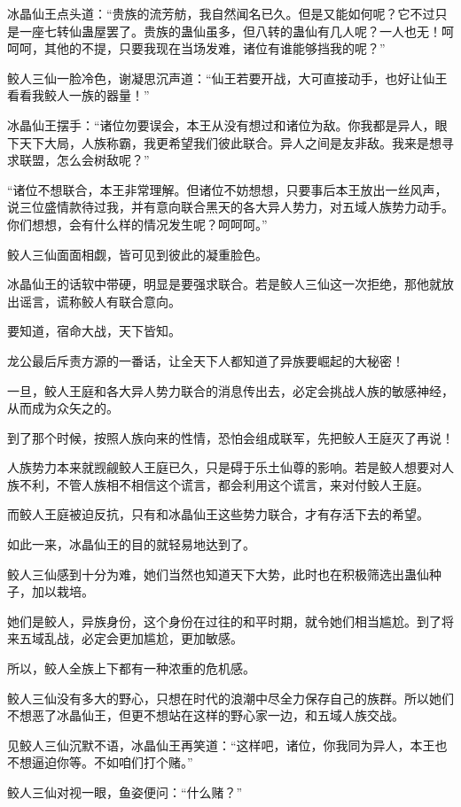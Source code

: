\begin{this_body}
冰晶仙王点头道：“贵族的流芳舫，我自然闻名已久。但是又能如何呢？它不过只是一座七转仙蛊屋罢了。贵族的蛊仙虽多，但八转的蛊仙有几人呢？一人也无！呵呵呵，其他的不提，只要我现在当场发难，诸位有谁能够挡我的呢？”

鲛人三仙一脸冷色，谢凝思沉声道：“仙王若要开战，大可直接动手，也好让仙王看看我鲛人一族的器量！”

冰晶仙王摆手：“诸位勿要误会，本王从没有想过和诸位为敌。你我都是异人，眼下天下大局，人族称霸，我更希望我们彼此联合。异人之间是友非敌。我来是想寻求联盟，怎么会树敌呢？”

“诸位不想联合，本王非常理解。但诸位不妨想想，只要事后本王放出一丝风声，说三位盛情款待过我，并有意向联合黑天的各大异人势力，对五域人族势力动手。你们想想，会有什么样的情况发生呢？呵呵呵。”

鲛人三仙面面相觑，皆可见到彼此的凝重脸色。

冰晶仙王的话软中带硬，明显是要强求联合。若是鲛人三仙这一次拒绝，那他就放出谣言，谎称鲛人有联合意向。

要知道，宿命大战，天下皆知。

龙公最后斥责方源的一番话，让全天下人都知道了异族要崛起的大秘密！

一旦，鲛人王庭和各大异人势力联合的消息传出去，必定会挑战人族的敏感神经，从而成为众矢之的。

到了那个时候，按照人族向来的性情，恐怕会组成联军，先把鲛人王庭灭了再说！

人族势力本来就觊觎鲛人王庭已久，只是碍于乐土仙尊的影响。若是鲛人想要对人族不利，不管人族相不相信这个谎言，都会利用这个谎言，来对付鲛人王庭。

而鲛人王庭被迫反抗，只有和冰晶仙王这些势力联合，才有存活下去的希望。

如此一来，冰晶仙王的目的就轻易地达到了。

鲛人三仙感到十分为难，她们当然也知道天下大势，此时也在积极筛选出蛊仙种子，加以栽培。

她们是鲛人，异族身份，这个身份在过往的和平时期，就令她们相当尴尬。到了将来五域乱战，必定会更加尴尬，更加敏感。

所以，鲛人全族上下都有一种浓重的危机感。

鲛人三仙没有多大的野心，只想在时代的浪潮中尽全力保存自己的族群。所以她们不想恶了冰晶仙王，但更不想站在这样的野心家一边，和五域人族交战。

见鲛人三仙沉默不语，冰晶仙王再笑道：“这样吧，诸位，你我同为异人，本王也不想逼迫你等。不如咱们打个赌。”

鲛人三仙对视一眼，鱼姿便问：“什么赌？”


\end{this_body}
